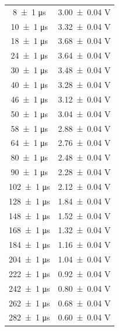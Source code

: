 \documentclass[a4paper]{article}
\begin{document}
\begin{appendices}
\begin{table}[htbp]
\begin{minipage}{0.48\textwidth}
\begin{tabular}{|c|c|}
        \num{8 \pm 1} \si{\micro\second} & \num{3.00 \pm 0.04} \si{\volt} \\
        \num{10 \pm 1} \si{\micro\second} & \num{3.32 \pm 0.04} \si{\volt} \\
        \num{18 \pm 1} \si{\micro\second} & \num{3.68 \pm 0.04} \si{\volt} \\
        \num{24 \pm 1} \si{\micro\second} & \num{3.64 \pm 0.04} \si{\volt} \\
        \num{30 \pm 1} \si{\micro\second} & \num{3.48 \pm 0.04} \si{\volt} \\
        \num{40 \pm 1} \si{\micro\second} & \num{3.28 \pm 0.04} \si{\volt} \\
        \num{46 \pm 1} \si{\micro\second} & \num{3.12 \pm 0.04} \si{\volt} \\
        \num{50 \pm 1} \si{\micro\second} & \num{3.04 \pm 0.04} \si{\volt} \\
        \num{58 \pm 1} \si{\micro\second} & \num{2.88 \pm 0.04} \si{\volt} \\
        \num{64 \pm 1} \si{\micro\second} & \num{2.76 \pm 0.04} \si{\volt} \\
        \num{80 \pm 1} \si{\micro\second} & \num{2.48 \pm 0.04} \si{\volt} \\
        \num{90 \pm 1} \si{\micro\second} & \num{2.28 \pm 0.04} \si{\volt} \\
        \num{102 \pm 1} \si{\micro\second} & \num{2.12 \pm 0.04} \si{\volt} \\
        \num{128 \pm 1} \si{\micro\second} & \num{1.84 \pm 0.04} \si{\volt} \\
        \num{148 \pm 1} \si{\micro\second} & \num{1.52 \pm 0.04} \si{\volt} \\
        \num{168 \pm 1} \si{\micro\second} & \num{1.32 \pm 0.04} \si{\volt} \\
        \num{184 \pm 1} \si{\micro\second} & \num{1.16 \pm 0.04} \si{\volt} \\
        \num{204 \pm 1} \si{\micro\second} & \num{1.04 \pm 0.04} \si{\volt} \\
        \num{222 \pm 1} \si{\micro\second} & \num{0.92 \pm 0.04} \si{\volt} \\ %
        \num{242 \pm 1} \si{\micro\second} & \num{0.80 \pm 0.04} \si{\volt} \\ %
        \num{262 \pm 1} \si{\micro\second} & \num{0.68 \pm 0.04} \si{\volt} \\ %
        \num{282 \pm 1} \si{\micro\second} & \num{0.60 \pm 0.04} \si{\volt} \\ %

\end{tabular}
\end{minipage}
\end{table}
\end{appendices}
\end{document}
